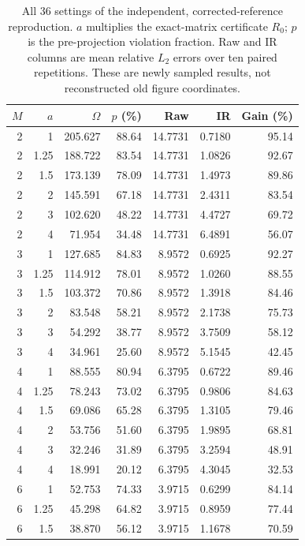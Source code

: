 \begin{table}[htbp]
\centering\small
\caption{All 36 settings of the independent, corrected-reference reproduction. $a$ multiplies the exact-matrix certificate $R_0$; $p$ is the pre-projection violation fraction. Raw and IR columns are mean relative $L_2$ errors over ten paired repetitions. These are newly sampled results, not reconstructed old figure coordinates.}\label{tab:restored-overshoot}
\begin{tabular}{rrrrrrr}
\toprule
$M$ & $a$ & $\widehat\Omega$ & $p$ (\%) & Raw & IR & Gain (\%) \\
\midrule
2 & 1 & 205.627 & 88.64 & 14.7731 & 0.7180 & 95.14 \\
2 & 1.25 & 188.722 & 83.54 & 14.7731 & 1.0826 & 92.67 \\
2 & 1.5 & 173.139 & 78.09 & 14.7731 & 1.4973 & 89.86 \\
2 & 2 & 145.591 & 67.18 & 14.7731 & 2.4311 & 83.54 \\
2 & 3 & 102.620 & 48.22 & 14.7731 & 4.4727 & 69.72 \\
2 & 4 & 71.954 & 34.48 & 14.7731 & 6.4891 & 56.07 \\
\midrule
3 & 1 & 127.685 & 84.83 & 8.9572 & 0.6925 & 92.27 \\
3 & 1.25 & 114.912 & 78.01 & 8.9572 & 1.0260 & 88.55 \\
3 & 1.5 & 103.372 & 70.86 & 8.9572 & 1.3918 & 84.46 \\
3 & 2 & 83.548 & 58.21 & 8.9572 & 2.1738 & 75.73 \\
3 & 3 & 54.292 & 38.77 & 8.9572 & 3.7509 & 58.12 \\
3 & 4 & 34.961 & 25.60 & 8.9572 & 5.1545 & 42.45 \\
\midrule
4 & 1 & 88.555 & 80.94 & 6.3795 & 0.6722 & 89.46 \\
4 & 1.25 & 78.243 & 73.02 & 6.3795 & 0.9806 & 84.63 \\
4 & 1.5 & 69.086 & 65.28 & 6.3795 & 1.3105 & 79.46 \\
4 & 2 & 53.756 & 51.60 & 6.3795 & 1.9895 & 68.81 \\
4 & 3 & 32.246 & 31.89 & 6.3795 & 3.2594 & 48.91 \\
4 & 4 & 18.991 & 20.12 & 6.3795 & 4.3045 & 32.53 \\
\midrule
6 & 1 & 52.753 & 74.33 & 3.9715 & 0.6299 & 84.14 \\
6 & 1.25 & 45.298 & 64.82 & 3.9715 & 0.8959 & 77.44 \\
6 & 1.5 & 38.870 & 56.12 & 3.9715 & 1.1678 & 70.59 \\

\end{tabular}
\end{table}
